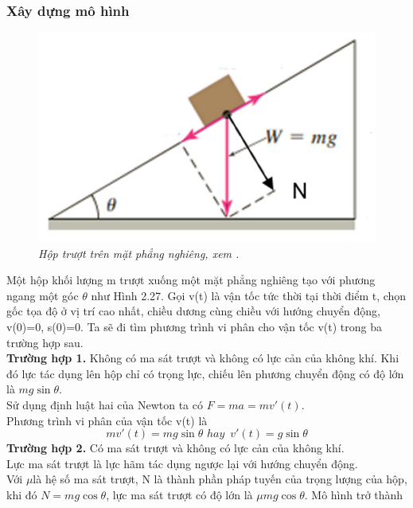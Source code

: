 \subsubsection{Xây dựng mô hình}
\begin{figure}[H]
	\centering
	\includegraphics[scale=0.6]{Images/hinh_2_26.png}
	\caption[Hộp trượt trên mặt phẳng nghiêng, xem \cite{ref4}.
	]{\itshape\fontsize{13pt}{0pt}\selectfont\centering Hộp trượt trên mặt phẳng nghiêng, xem \cite{ref4}.}
	\label{hinh2.26}
\end{figure} 
\noindent Một hộp khối lượng m trượt xuống một mặt phẳng nghiêng tạo với phương ngang một góc $\theta $ như Hình 2.27. Gọi v(t) là vận tốc tức thời tại thời điểm t, chọn gốc tọa độ ở vị trí cao nhất, chiều dương cùng chiều với hướng chuyển động, v(0)=0, s(0)=0. Ta sẽ đi tìm phương trình vi phân cho vận tốc v(t) trong ba trường hợp sau. \\
\textbf{Trường hợp 1. }Không có ma sát trượt và không có lực cản của không khí.
Khi đó lực tác dụng lên hộp chỉ có trọng lực, chiếu lên phương chuyển động có độ lớn là $mg\sin \theta $.\\
Sử dụng định luật hai của Newton ta có $F=ma=mv'(t)$.\\
Phương trình vi phân của vận tốc v(t) là 
\begin{equation}
	mv'(t)=mg\sin \theta \,\,hay\,\,\,v'(t)=g\sin \theta 
\label{eq:2.20}
\end{equation}
\textbf{Trường hợp 2. } Có ma sát trượt và không có lực cản của không khí.\\
Lực ma sát trượt là lực hãm tác dụng ngược lại với hướng chuyển động.\\
Với $\mu $là hệ số ma sát trượt,  N là thành phần pháp tuyến của trọng lượng của hộp, khi đó $N=mg\cos \theta $, lực ma sát trượt có độ lớn là $\mu mg\cos \theta $. Mô hình trở thành       
